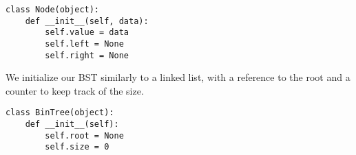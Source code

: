 \begin{lstlisting}
class Node(object):
    def __init__(self, data):
        self.value = data
        self.left = None
        self.right = None
\end{lstlisting}
We initialize our BST similarly to a linked list, with a reference to the root and a counter to keep track of the size.
\begin{lstlisting}
class BinTree(object):
    def __init__(self):
        self.root = None
        self.size = 0
\end{lstlisting}
\begin{comment}
Trees are similar to linked lists, but rather than just pointing to one node that comes after them, they can point to many.
If our data can be sorted, we can add them in such a way that we know how to traverse the tree to find them, which can substantially cut down search time.
This makes trees especially good if we need fast search times.

There are many types of trees, but we will only cover one of the most basic ones: the \emph{binary search tree} (BST).
The binary search tree will show us the basic elements of the tree data structure.
A binary tree is a tree that has a maximum of two children per node, has no duplicate elements, and has an ordered structure.
Trees are commonly ordered such that the left half of the tree contains elements less than the root, and the right contains elements greater than the root.

Ordering the tree this way means that the very first time we choose right or left, we cut out half of the tree!
Similarly, at each step we cut out half of the remaining nodes to search.
This makes searching a binary tree very fast.
Because the process of locating a node is so quick, the processes of inserting and removing nodes are as well.

A node in a binary search tree holds a value and references to the left and right subtrees.
A node's children are the nodes it references.
The root of the tree has no parents, and is where we always start searching.
A node with no children is called a leaf node.


BSTs are a recursive data structure because each of the left and right subtrees are themselves BSTs.

Many of the algorithms for working with binary search trees are also recursive.
A recursive function is a function that calls itself until it reaches a base case.
In the search function below, the two base cases either establish that we have the correct node, or that we don't have a node at all.
In both these cases, we simply return what we have.
If neither base case applies, we search either the left or the right subtree depending on if the data we are looking for is greater or less than the data in the node we are looking at.
While recursive functions are often useful and intuitive with trees, we don't have to use them if we don't want to.
In fact, for large trees, a recursive algorithm will consume a lot of resources.


\end{comment}
